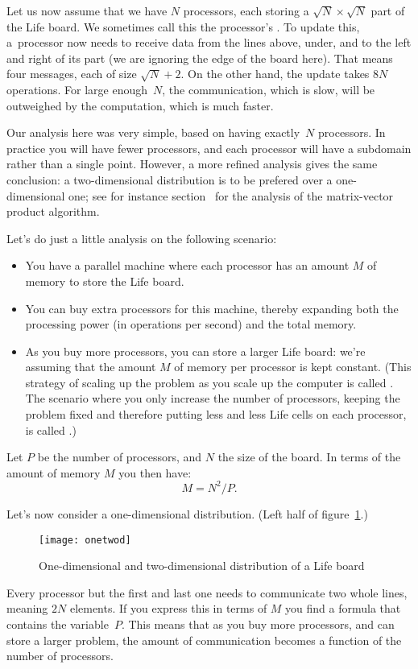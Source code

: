 Let us now assume that we have $N$ processors, each storing a $\sqrt
N\times\sqrt N$ part of the Life board. We sometimes call this 
the processor's .
To update this, a~processor
now needs to receive data from the lines above, under, and to the left
and right of its part (we are ignoring the edge of the board here).
That means four messages, each of size $\sqrt N+2$.
On the other hand, the update takes $8N$ operations. For large enough~$N$,
the communication, which is slow, will be outweighed by the computation,
which is much faster.

Our analysis here was very simple, based on having exactly~$N$ processors.
In practice you will have fewer processors, and each processor will
have a subdomain rather than a single point.
However, a more refined analysis gives the same conclusion:
a two-dimensional distribution is to be prefered over a one-dimensional one;
see for instance section~ for the analysis
of the matrix-vector product algorithm.

Let's do just a little analysis on the following scenario:
\begin{itemize}
\item You have a parallel machine where each processor has an amount
  $M$ of memory to store the Life board.
\item You can buy extra processors for this machine, thereby expanding
  both the processing power (in operations per second) and the total
  memory.
\item As you buy more processors, you can store a larger Life board:
  we're assuming that the amount $M$ of memory per processor is kept constant. (This
  strategy of scaling up the problem as you scale up the computer is
  called . The scenario where you only
  increase the number of processors, keeping the problem fixed and
  therefore putting less and less Life cells on each processor,
  is called .)
\end{itemize}

Let $P$ be the number of processors, and $N$ the size of the
board. In terms of the amount of memory $M$ you then have:
\[ M=N^2/P. \]

Let's now consider a one-dimensional distribution. (Left half of figure~\ref{fig:onetwod}.)
\begin{figure}[t]
  \texttt{[image: onetwod]}
  \caption{One-dimensional and two-dimensional distribution of a Life board}
  \label{fig:onetwod}
\end{figure}
Every processor but
the first and last one needs to communicate two whole lines, meaning
$2N$ elements. If you express this in terms of $M$ you find a formula
that contains the variable~$P$. This means that as you buy more
processors, and can store a larger problem, the amount of
communication becomes a function of the number of processors.

